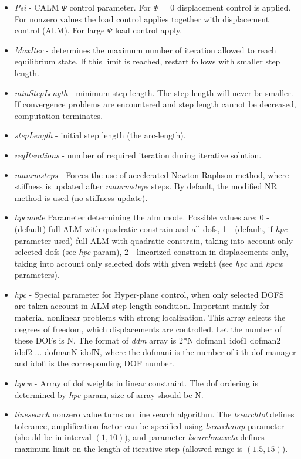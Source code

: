 \documentclass[a4paper]{article}
\newcommand{\param}[1]{{\em #1}}
\begin{document}
\begin{itemize}
\item \param{Psi} - CALM $\Psi$ control parameter. For $\Psi$ = 0
displacement control is applied. For nonzero values the load control
applies together with displacement control (ALM). For large $\Psi$
load control apply.
\item \param{MaxIter} - determines the maximum number of iteration allowed to
reach equilibrium state. If this limit is reached, restart follows
with smaller step length.
\item \param{min\-Step\-Le\-ngth} - minimum step length. The step length will never be
smaller. If convergence problems are encountered and step length cannot
be decreased, computation terminates.
\item \param{stepLength} - initial step length (the arc-length).
\item \param{reqIterations} - number of required iteration during iterative solution. 
\item \param{manrmsteps} - Forces the use of accelerated
Newton Raphson met\-hod, where stiffness is updated after
\param{manrmsteps} steps. By default, the modified NR
method is used (no stiffness update).
\item \param{hpcmode} Parameter determining the alm mode.
Possible values are: 0 - (default) full ALM with quadratic constrain and
all dofs, 1 - (default, if \param{hpc} parameter used) full ALM with quadratic constrain, taking into account
only selected dofs (see \param{hpc} param), 2 - linearized constrain
in displacements only, taking into account only selected dofs with
given weight (see \param{hpc} and \param{hpcw} parameters).
\item \param{hpc} - Special parameter for Hyper-plane control, when only
selected DOFS are taken account in ALM step length
condition. Important mainly for material nonlinear problems with
strong localization. This array selects the degrees of freedom, 
which displacements are controlled. Let the number of these DOFs is N.
The format of \param{ddm} array is 2*N dofman1 idof1
dofman2 idof2 ... dofmanN idofN, where the dofmani is the number of i-th dof manager  and idofi is the
corresponding DOF number. 
\item \param{hpcw} - Array of dof weights in linear constraint. The
dof ordering is determined by \param{hpc} param, size of array should
be N.
\item \param {linesearch} nonzero value turns on line search
  algorithm. The \param{lsearchtol} defines tolerance, amplification
  factor can be specified using \param{lsearchamp} parameter (should
  be in interval $(1,10)$), and parameter \param{lsearchmaxeta}
  defines maximum limit on the length of iterative step (allowed range
  is $(1.5,15)$).
\end{itemize}
\end{document}

